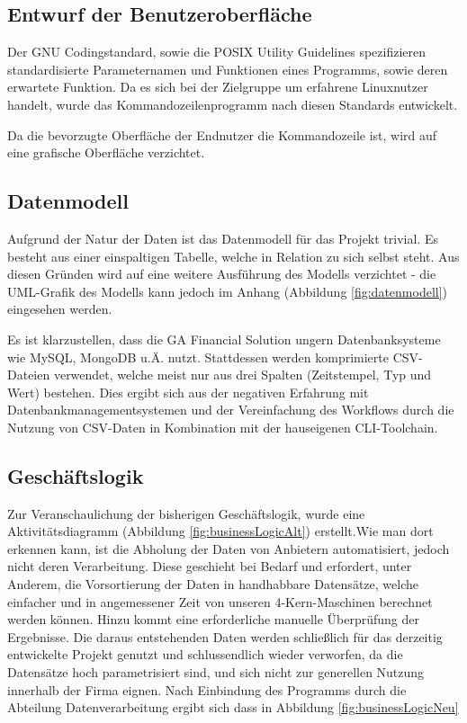 

\subsection{Entwurf der Benutzeroberfläche}
Der GNU Codingstandard\cite{gnuCodingStandard},
sowie die POSIX Utility Guidelines\cite{posixGuidelines}
spezifizieren standardisierte Parameternamen und Funktionen eines Programms, sowie
deren erwartete Funktion. Da es sich bei der Zielgruppe um erfahrene Linuxnutzer handelt, wurde das Kommandozeilenprogramm nach diesen Standards entwickelt.\par

Da die bevorzugte Oberfläche der Endnutzer die Kommandozeile ist, wird auf eine grafische Oberfläche verzichtet.

\subsection{Datenmodell}
Aufgrund der Natur der Daten ist das Datenmodell für das Projekt trivial. Es besteht aus einer
einspaltigen Tabelle, welche in Relation zu sich selbst steht. Aus diesen Gründen wird auf eine weitere Ausführung des 
Modells verzichtet - die UML-Grafik des Modells kann jedoch im Anhang (Abbildung \ref{fig:datenmodell}) eingesehen werden.

Es ist klarzustellen, dass die GA Financial Solution ungern Datenbanksysteme wie
MySQL, MongoDB u.Ä. nutzt. Stattdessen werden komprimierte CSV-Dateien verwendet, welche
meist nur aus drei Spalten (Zeitstempel, Typ und Wert) bestehen. Dies ergibt sich aus
der negativen Erfahrung mit Datenbankmanagementsystemen und der Vereinfachung des Workflows durch
die Nutzung von CSV-Daten in Kombination mit der hauseigenen CLI-Toolchain.


\subsection{Geschäftslogik}
Zur Veranschaulichung der bisherigen Geschäftslogik, wurde eine Aktivitätsdiagramm (Abbildung \ref{fig:businessLogicAlt})
erstellt.Wie man dort erkennen kann, ist die Abholung der Daten von Anbietern automatisiert, jedoch nicht deren Verarbeitung.
Diese geschieht bei Bedarf und erfordert, unter Anderem, die Vorsortierung der Daten in handhabbare Datensätze, welche einfacher und in angemessener Zeit von unseren 4-Kern-Maschinen
berechnet werden können. Hinzu kommt eine erforderliche manuelle Überprüfung
der Ergebnisse. Die daraus entstehenden Daten werden schließlich für das derzeitig entwickelte Projekt
genutzt und schlussendlich wieder verworfen, da die Datensätze hoch parametrisiert sind, und sich nicht zur generellen Nutzung innerhalb der Firma eignen. Nach Einbindung des Programms durch die Abteilung Datenverarbeitung ergibt sich dass in Abbildung \ref{fig:businessLogicNeu}\par



